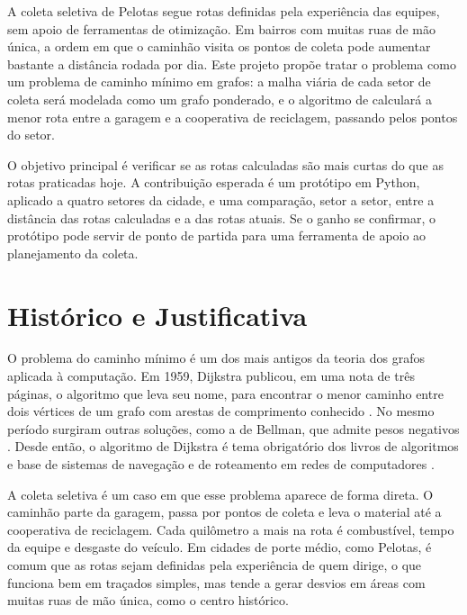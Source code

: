 \documentclass[tcc-proposta]{texufpel}
\begin{document}
A coleta seletiva de Pelotas segue rotas definidas pela experiência das
equipes, sem apoio de ferramentas de otimização. Em bairros com muitas ruas de
mão única, a ordem em que o caminhão visita os pontos de coleta pode aumentar
bastante a distância rodada por dia. Este projeto propõe tratar o problema
como um problema de caminho mínimo em grafos: a malha viária de cada setor de
coleta será modelada como um grafo ponderado, e o algoritmo de
\citet{Dijkstra:1959:NTP} calculará a menor rota entre a garagem e a
cooperativa de reciclagem, passando pelos pontos do setor.

O objetivo principal é verificar se as rotas calculadas são mais curtas do que
as rotas praticadas hoje. A contribuição esperada é um protótipo em Python,
aplicado a quatro setores da cidade, e uma comparação, setor a setor, entre a
distância das rotas calculadas e a das rotas atuais. Se o ganho se confirmar,
o protótipo pode servir de ponto de partida para uma ferramenta de apoio ao
planejamento da coleta.

\chapter{Histórico e Justificativa}

O problema do caminho mínimo é um dos mais antigos da teoria dos grafos
aplicada à computação. Em 1959, Dijkstra publicou, em uma nota de três
páginas, o algoritmo que leva seu nome, para encontrar o menor caminho entre
dois vértices de um grafo com arestas de comprimento conhecido
\citep{Dijkstra:1959:NTP}. No mesmo período surgiram outras soluções, como a
de Bellman, que admite pesos negativos \citep{Cormen:2022:IA}. Desde então, o
algoritmo de Dijkstra é tema obrigatório dos livros de algoritmos e base de
sistemas de navegação e de roteamento em redes de computadores
\citep{Knuth:1997:ACP,Cormen:2022:IA}.

A coleta seletiva é um caso em que esse problema aparece de forma direta. O
caminhão parte da garagem, passa por pontos de coleta e leva o material até a
cooperativa de reciclagem. Cada quilômetro a mais na rota é combustível,
tempo da equipe e desgaste do veículo. Em cidades de porte médio, como
Pelotas, é comum que as rotas sejam definidas pela experiência de quem
dirige, o que funciona bem em traçados simples, mas tende a gerar desvios em
áreas com muitas ruas de mão única, como o centro histórico.
\end{document}
